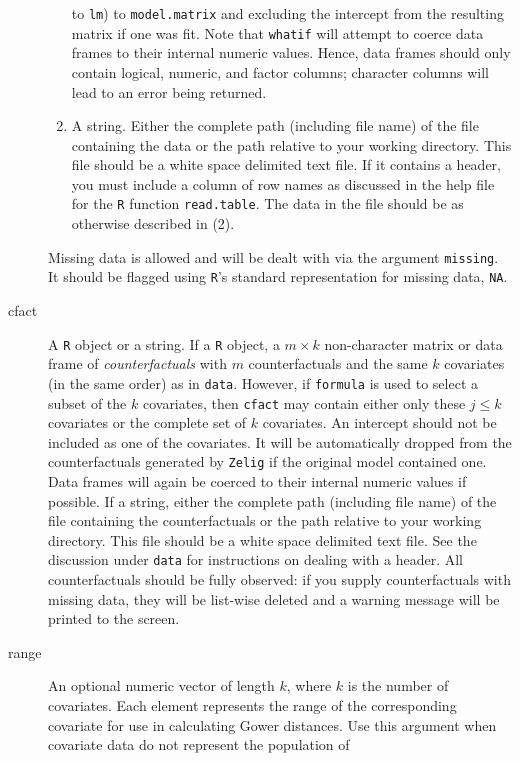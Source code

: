 \documentclass[oneside,letterpaper,titlepage]{article}
\begin{document}
\begin{description}
\begin{enumerate}
    to \texttt{lm}) to \texttt{model.matrix} and excluding the 
    intercept from the resulting matrix if one was fit.  Note
    that \texttt{whatif} will attempt to coerce data frames to their
    internal numeric values.  Hence, data frames should only contain
    logical, numeric, and factor columns; character columns will lead
    to an error being returned.
  \item A string.  Either the complete path (including file name) of
    the file containing the data or the path relative to your working
    directory.  This file should be a white space delimited text file.
    If it contains a header, you must include a column of row names as
    discussed in the help file for the \texttt{R} function
    \texttt{read.table}.  The data in the file should be as otherwise
    described in (2).
  \end{enumerate}
  Missing data is allowed and will be dealt with via the argument
  \texttt{missing}.  It should be flagged using \texttt{R}'s
  standard representation for missing data, \texttt{NA}.
\item[cfact] A \texttt{R} object or a string.  If a \texttt{R} object,
  a $m \times k$ non-character matrix or data frame of
  \emph{counterfactuals} with $m$ counterfactuals and the same $k$
  covariates (in the same order) as in \texttt{data}.  However, if
  \texttt{formula} is used to select a subset of the $k$ covariates,
  then \texttt{cfact} may contain either only these $j \leq k$
  covariates or the complete set of $k$ covariates.  An intercept
  should not be included as one of the covariates.  It will be
  automatically dropped from the counterfactuals generated by
  \texttt{Zelig} if the original model contained one.  Data frames
  will again be coerced to their internal numeric values if possible.
  If a string, either the complete path (including file name) of the
  file containing the counterfactuals or the path relative to your
  working directory.  This file should be a white space delimited text
  file.  See the discussion under \texttt{data} for instructions on
  dealing with a header.  All counterfactuals should be fully
  observed: if you supply counterfactuals with missing data, they will
  be list-wise deleted and a warning message will be printed to the
  screen.
\item[range] An optional numeric vector of length $k$, where $k$ is
  the number of covariates.  Each element represents the range of the
  corresponding covariate for use in calculating Gower distances.  Use
  this argument when covariate data do not represent the population of

\end{description}
\end{document}
